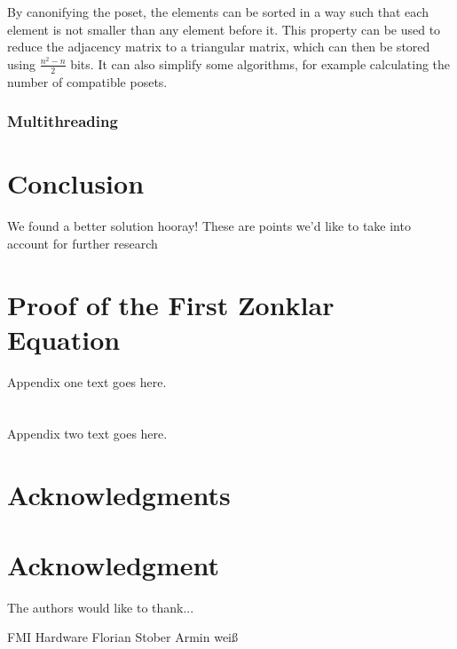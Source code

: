 \documentclass[10pt,journal,compsoc]{IEEEtran}
\begin{document}
By canonifying the poset, the elements can be sorted in a way such that each element is not smaller than any element before it.
This property can be used to reduce the adjacency matrix to a triangular matrix, which can then be stored using $\frac{n^2 - n}{2}$ bits.
It can also simplify some algorithms, for example calculating the number of compatible posets.

\subsubsection{Multithreading}

\section{Conclusion}
We found a better solution hooray!
These are points we'd like to take into account for further research


\appendices
\section{Proof of the First Zonklar Equation}
Appendix one text goes here.
\section{}
Appendix two text goes here.


\ifCLASSOPTIONcompsoc
  \section*{Acknowledgments}
\else
  \section*{Acknowledgment}
\fi


The authors would like to thank...

FMI
Hardware
Florian Stober
Armin weiß

\ifCLASSOPTIONcaptionsoff
  \newpage
\fi




\end{document}
